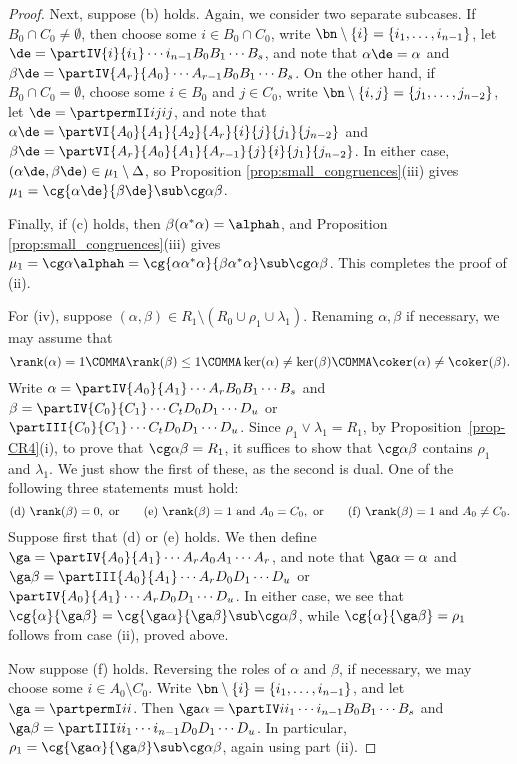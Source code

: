 \begin{proof}
Next, suppose (b) holds.  Again, we consider two separate subcases.  If $B_0\cap C_0\not=\emptyset$, then choose some ${i\in B_0\cap C_0}$, write $\bn\setminus\{i\}=\{i_1,\ldots,i_{n-1}\}$, let $\de=\partIV{i}{i_1}\cdots{i_{n-1}}{B_0}{B_1}\cdots{B_s}$,
and note that $\alpha\de=\alpha $ and $\beta\de=\partIV{A_r}{A_0}\cdots{A_{r-1}}{B_0}{B_1}\cdots{B_s}$.
On the other hand, if
$B_0\cap C_0=\emptyset$, choose some $i\in B_0$ and $j\in C_0$, write $\bn\setminus\{i,j\}=\{j_1,\ldots,j_{n-2}\}$, let
$\de=\partpermII ijij$,
and note that $\alpha\de=\partVI{A_0}{A_1}{A_2}{A_r}{i}{j}{j_1}{j_{n-2}}$ and $\beta\de=\partVI{A_r}{A_0}{A_1}{A_{r-1}}{j}{i}{j_1}{j_{n-2}}$.
In either case, $(\alpha\de,\beta\de)\in\mu_1\setminus\Delta$, so Proposition \ref{prop:small_congruences}(iii) gives $\mu_1=\cg{\alpha\de}{\beta\de}\sub\cg\alpha\beta$.

Finally, if (c) holds, then $\beta(\alpha^*\alpha)=\alphah$, and Proposition \ref{prop:small_congruences}(iii) gives $\mu_1=\cg\alpha{\alphah}=\cg{\alpha\alpha^*\alpha}{\beta\alpha^*\alpha}\sub\cg\alpha\beta$.
%
This completes the proof of (ii).

For (iv), suppose $(\alpha,\beta)\in R_1\setminus (R_0 \cup \rho_1 \cup \lambda_1 )$.
Renaming $\alpha,\beta$ if necessary, we may assume that
\[
\rank(\alpha)=1\COMMA
\rank(\beta)\leq1 \COMMA
\ker(\alpha)\not=\ker(\beta)\COMMA
\coker(\alpha)\not=\coker(\beta).
\]
Write $\alpha=\partIV{A_0}{A_1}\cdots{A_r}{B_0}{B_1}\cdots{B_s}$ and $\beta=\partIV{C_0}{C_1}\cdots{C_t}{D_0}{D_1}\cdots{D_u}$ or $\partIII{C_0}{C_1}\cdots{C_t}{D_0}{D_1}\cdots{D_u}$.
Since $\rho_1\vee\lambda_1=R_1$, by Proposition~\ref{prop-CR4}(i), to prove that $\cg\alpha\beta=R_1$, it suffices to show that $\cg\alpha\beta$ contains $\rho_1$ and $\lambda_1$.  We just show the first of these, as the second is dual.  One of the following three statements must hold:
\[
\text{(d)}\ \rank(\beta)=0,\ \text{or}\ \ \ \ \ \
\text{(e)}\ \rank(\beta)=1\  \text{and}\  A_0=C_0,\ \text{or}\ \ \  \ \ \
\text{(f)}\ \rank(\beta)=1\ \text{and}\ A_0\not=C_0.
\]
Suppose first that (d) or (e) holds.  We then define $\ga=\partIV{A_0}{A_1}\cdots{A_r}{A_0}{A_1}\cdots{A_r}$,
and note that $\ga\alpha=\alpha$ and $\ga\beta=\partIII{A_0}{A_1}\cdots{A_r}{D_0}{D_1}\cdots{D_u}$ or $\partIV{A_0}{A_1}\cdots{A_r}{D_0}{D_1}\cdots{D_u}$.
In either case, we see that $\cg{\alpha}{\ga\beta}=\cg{\ga\alpha}{\ga\beta}\sub\cg\alpha\beta$, while ${\cg{\alpha}{\ga\beta}=\rho_1}$ follows from case (ii), proved above.

Now suppose (f) holds.  Reversing the roles of $\alpha$ and $\beta$, if necessary, we may choose some $i\in A_0\setminus C_0$.  Write $\bn\setminus\{i\}=\{i_1,\ldots,i_{n-1}\}$, and let $\ga=\partpermI ii$.
Then $\ga\alpha=\partIV i{i_1}\cdots{i_{n-1}}{B_0}{B_1}\cdots{B_s}$ and $\ga\beta=\partIII i{i_1}\cdots{i_{n-1}}{D_0}{D_1}\cdots{D_u}$.
In particular, $\rho_1=\cg{\ga\alpha}{\ga\beta}\sub\cg\alpha\beta$, again using part (ii).  \end{proof}


